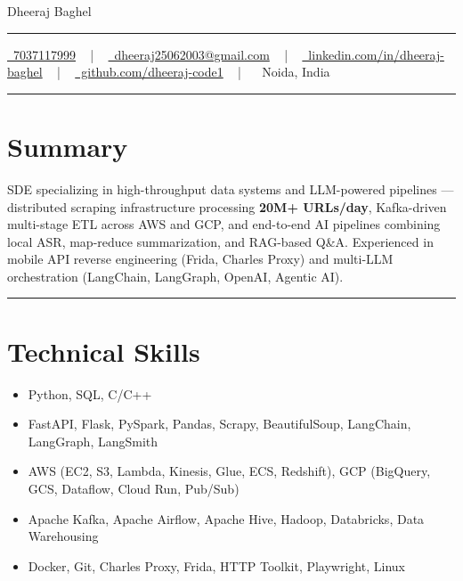 \documentclass[letterpaper,9pt]{article}
\newcommand{\documentTitle}[2]{
  \begin{center}
    {\Huge\color{accentTitle} #1}
    \vspace{2pt}
    {\color{accentLine} \hrule}
    \vspace{7pt}
    \footnotesize{#2}
    \vspace{1pt}
    {\color{accentLine} \hrule}
  \end{center}
}
\begin{document}

  \documentTitle{Dheeraj Baghel}{
    \href{tel:7037117999}{
      \raisebox{-0.05\height} \faPhone\ 7037117999} ~ | ~
    \href{mailto:dheeraj25062003@gmail.com}{
      \raisebox{-0.15\height} \faEnvelope\ dheeraj25062003@gmail.com} ~ | ~
    \href{https://www.linkedin.com/in/dheeraj-baghel-51b568209/}{
      \raisebox{-0.15\height} \faLinkedin\ linkedin.com/in/dheeraj-baghel} ~ | ~
    \href{https://github.com/dheeraj-code1}{
      \raisebox{-0.15\height} \faGithub\ github.com/dheeraj-code1} ~ | ~
    \raisebox{-0.05\height} \faMapMarker\ Noida, India
  }


\vspace{-0.4em}
\section*{Summary}
\vspace{-0.3em}

\noindent SDE specializing in high-throughput data systems and LLM-powered pipelines — distributed scraping infrastructure processing \textbf{20M+ URLs/day}, Kafka-driven multi-stage ETL across AWS and GCP, and end-to-end AI pipelines combining local ASR, map-reduce summarization, and RAG-based Q\&A. Experienced in mobile API reverse engineering (Frida, Charles Proxy) and multi-LLM orchestration (LangChain, LangGraph, OpenAI, Agentic AI).
\vspace{1pt}
{\color{accentLine} \hrule}


  \section{Technical Skills}
\vspace{-0.3em}
  \begin{itemize}[itemsep=-2px, parsep=1pt, leftmargin=120pt, labelwidth=115pt, align=left]
    \item[\textbf{Languages}] Python, SQL, C/C++
    \item[\textbf{Frameworks}] FastAPI, Flask, PySpark, Pandas, Scrapy, BeautifulSoup, LangChain, LangGraph, LangSmith
    \item[\textbf{Cloud}] AWS (EC2, S3, Lambda, Kinesis, Glue, ECS, Redshift), GCP (BigQuery, GCS, Dataflow, Cloud Run, Pub/Sub)
    \item[\textbf{Data \& Orchestration}] Apache Kafka, Apache Airflow, Apache Hive, Hadoop, Databricks, Data Warehousing
    \item[\textbf{Tools \& OS}] Docker, Git, Charles Proxy, Frida, HTTP Toolkit, Playwright, Linux
  \end{itemize}
\end{document}
